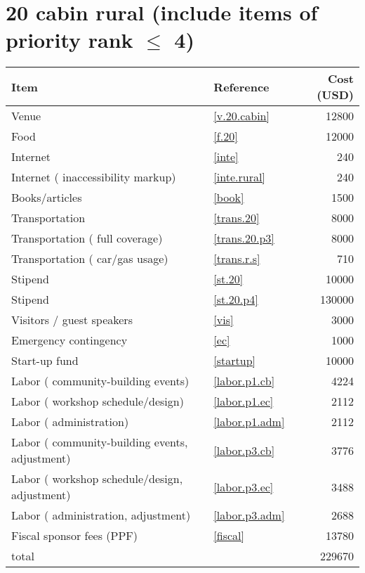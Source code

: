\section*{20 cabin rural (include items of priority rank $\leq$ 4)}
\begin{center}
\begin{tabular}{llr}
Item & Reference & Cost (USD) \\ \hline
Venue & \ref{v.20.cabin} & 12800 \\
Food & \ref{f.20} & 12000 \\
Internet & \ref{inte} & 240 \\
Internet ( inaccessibility markup) & \ref{inte.rural} & 240 \\
Books/articles & \ref{book} & 1500 \\
Transportation & \ref{trans.20} & 8000 \\
Transportation ( full coverage) & \ref{trans.20.p3} & 8000 \\
Transportation ( car/gas usage) & \ref{trans.r.s} & 710 \\
Stipend & \ref{st.20} & 10000 \\
Stipend & \ref{st.20.p4} & 130000 \\
Visitors / guest speakers & \ref{vis} & 3000 \\
Emergency contingency & \ref{ec} & 1000 \\
Start-up fund & \ref{startup} & 10000 \\
Labor ( community-building events) & \ref{labor.p1.cb} & 4224 \\
Labor ( workshop schedule/design) & \ref{labor.p1.ec} & 2112 \\
Labor ( administration) & \ref{labor.p1.adm} & 2112 \\
Labor ( community-building events, adjustment) & \ref{labor.p3.cb} & 3776 \\
Labor ( workshop schedule/design, adjustment) & \ref{labor.p3.ec} & 3488 \\
Labor ( administration, adjustment) & \ref{labor.p3.adm} & 2688 \\
Fiscal sponsor fees (PPF) & \ref{fiscal} & 13780 \\ \hline
total &  & 229670
\end{tabular}
\end{center}
\newpage
